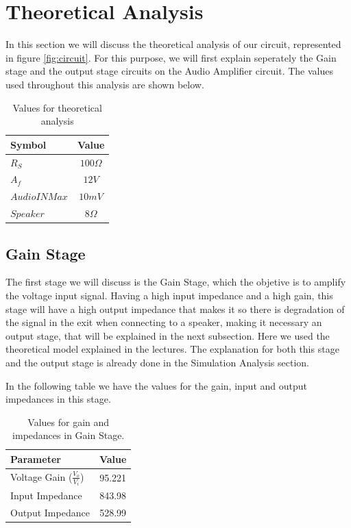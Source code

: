 \newpage
\section{Theoretical Analysis}
\label{sec:analysis}

In this section we will discuss the theoretical analysis of our circuit, represented in figure \ref{fig:circuit}. For this purpose, we will first explain seperately the Gain stage and the output stage circuits on the Audio Amplifier circuit. The values used throughout this analysis are shown below. 

\begin{table}[h]
    \centering
    \begin{tabular}{|l|c|}
    \hline
    {\bf Symbol} & {\bf Value} \\ \hline
    $R_{S}$ & $100\Omega$ \\ \hline
    $A_f$ & $12 V$ \\ \hline
    $Audio IN Max$ & $10 mV$  \\ \hline
    $Speaker$ & $8 \Omega$\\ \hline
    \end{tabular}
    \caption{Values for theoretical analysis}
    \label{tab:values}
\end{table}


\subsection{Gain Stage}
\label{sec:gain}


The first stage we will discuss is the Gain Stage, which the objetive is to amplify the voltage input signal. Having a high input impedance and a high gain, this stage will have a high output impedance that makes it so there is degradation of the signal in the exit when connecting to a speaker, making it necessary an output stage, that will be explained in the next subsection. Here we used the theoretical model explained in the lectures. The explanation for both this stage and the output stage is already done in the Simulation Analysis section.

In the following table we have the values for the gain, input and output impedances in this stage.


\begin{table}[h]
    \centering
    \begin{tabular}{|l|c|}
    \hline
    {\bf Parameter} & {\bf Value} \\ \hline \hline
    Voltage Gain ($\frac{V_{o}}{V_{i}}$)  & 95.221 \\ \hline
    Input Impedance & 843.98 \\ \hline
    Output Impedance  & 528.99 \\ \hline
    \end{tabular}
    \caption{Values for gain and impedances in Gain Stage.}
    \label{tab:values}
\end{table}


